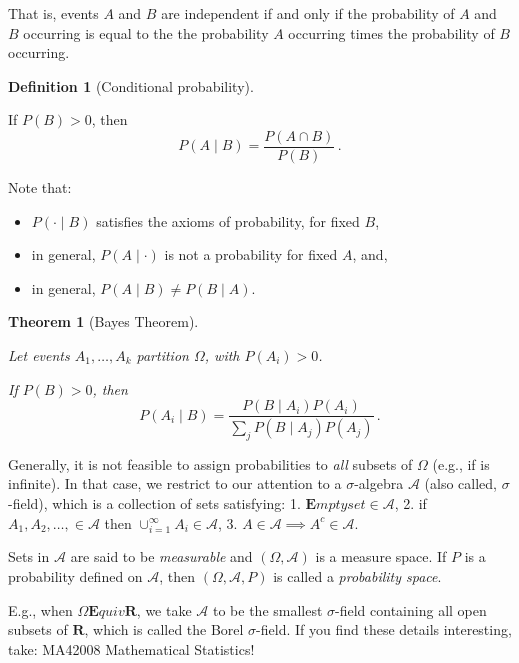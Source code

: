 \documentclass[
  a4paper,
  oneside]{book}
\providecommand{\tightlist}{%
  \setlength{\itemsep}{0pt}\setlength{\parskip}{0pt}}\usepackage{longtable,booktabs,array}
\theoremstyle{definition}
\newtheorem{definition}{Definition}[chapter]
\theoremstyle{definition}
\theoremstyle{definition}
\theoremstyle{plain}
\newtheorem{theorem}{Theorem}[chapter]
\theoremstyle{remark}
\begin{document}
That is, events \(A\) and \(B\) are independent if and only if the
probability of \(A\) and \(B\) occurring is equal to the the probability
\(A\) occurring times the probability of \(B\) occurring.

\begin{definition}[Conditional
probability]\protect\hypertarget{def-cond-prob}{}\label{def-cond-prob}

If \(P(B) > 0\), then \[P(A \mid B) = \frac{P(A \cap B)}{P(B)}\,.\]

\end{definition}

Note that:

\begin{itemize}
\tightlist
\item
  \(P(\cdot \mid B)\) satisfies the axioms of probability, for fixed
  \(B\),
\item
  in general, \(P(A \mid \cdot)\) is not a probability for fixed \(A\),
  and,
\item
  in general, \(P(A\mid B) \neq P(B \mid A)\).
\end{itemize}

\begin{theorem}[Bayes
Theorem]\protect\hypertarget{thm-bayes}{}\label{thm-bayes}

Let events \(A_1, \dots, A_k\) partition \(\Omega\), with
\(P(A_i) > 0\).

If \(P(B) > 0\), then
\[P(A_i \mid B) = \frac{P(B\mid A_i) P(A_i)}{\sum_j P(B \mid A_j) P(A_j)}\,.\]

\end{theorem}

Generally, it is not feasible to assign probabilities to \emph{all}
subsets of \(\Omega\) (e.g., if \Omega is infinite). In that case, we
restrict to our attention to a \(\sigma\)-algebra \(\mathcal{A}\) (also
called, \(\sigma\)-field), which is a collection of sets satisfying: 1.
\(\mathbf{E}mptyset \in \mathcal{A}\), 2. if
\(A_1, A_2, \dots, \in \mathcal{A}\) then
\(\cup_{i = 1}^\infty A_i \in \mathcal{A}\), 3.
\(A\in \mathcal{A} \implies A^c \in \mathcal{A}\).

Sets in \(\mathcal{A}\) are said to be \emph{measurable} and
\((\Omega, \mathcal{A})\) is a measure space. If \(P\) is a probability
defined on \(\mathcal{A}\), then \((\Omega, \mathcal{A}, P)\) is called
a \emph{probability space}.

E.g., when \(\Omega \mathbf{E}quiv \mathbf{R}\), we take \(\mathcal{A}\)
to be the smallest \(\sigma\)-field containing all open subsets of
\(\mathbf{R}\), which is called the Borel \(\sigma\)-field. If you find
these details interesting, take: MA42008 Mathematical Statistics!
\end{document}
